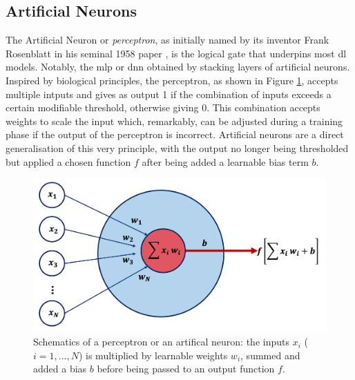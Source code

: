 \subsection{Artificial Neurons}
The Artificial Neuron or \textit{perceptron}, as initially named by its inventor Frank Rosenblatt in his seminal 1958 paper \cite{rosenblatt1958perceptron}, is the logical gate that underpins most \gls{dl} models. Notably, the \gls{mlp} or \gls{dnn} obtained by stacking layers of artificial neurons. Inspired by biological principles, the perceptron, as shown in Figure \ref{fig:annModel}, accepts multiple intputs and gives as output 1 if the combination of inputs exceeds a certain modifiable threshold, otherwise giving 0. This combination accepts weights to scale the input which, remarkably, can be adjusted during a training phase if the output of the perceptron is incorrect. Artificial neurons are a direct generalisation of this very principle, with the output no longer being thresholded but applied a chosen function $f$ after being added a learnable bias term $b$. 

\begin{figure}[h!]
    \center
    \includegraphics[scale=0.4]{Images/ML/ann.png}
    \caption{Schematics of a perceptron or an artifical neuron: the inputs $x_i$ ($i= 1, ..., N$) is multiplied by learnable weights $w_i$, summed and added a bias $b$ before being passed to an output function $f$.} 
    \label{fig:annModel}
\end{figure}

